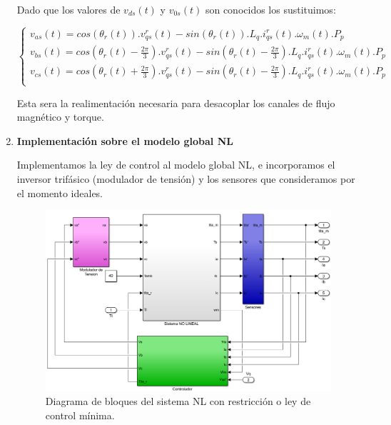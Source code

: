 \documentclass{article}
\begin{document}
\begin{enumerate}[label=\roman*.]
    Dado que los valores de $v_{ds}(t)$ y $v_{0s}(t)$ son conocidos los sustituimos: 

    \begin{equation}
        \begin{cases}
            v_{as}(t) = cos(\theta_{r}(t)).v_{qs}^r(t) - sin(\theta_{r}(t)).L_{q}.i_{qs}^r(t).\omega_{m}(t).P_{p}\\
            v_{bs}(t) = cos(\theta_{r}(t) - \frac{2\pi}{3}).v_{qs}^r(t) - sin(\theta_{r}(t) - \frac{2\pi}{3}).L_{q}.i_{qs}^r(t).\omega_{m}(t).P_{p}\\
            v_{cs}(t) = cos(\theta_{r}(t) + \frac{2\pi}{3}).v_{qs}^r(t) - sin(\theta_{r}(t) - \frac{2\pi}{3}).L_{q}.i_{qs}^r(t).\omega_{m}(t).P_{p}\\
        \end{cases}
    \end{equation}

    Esta sera la realimentación necesaria para desacoplar los canales de flujo magnético y torque.

    \item \textbf{Implementación sobre el modelo global NL}


    Implementamos la ley de control al modelo global NL, e incorporamos el inversor trifásico (modulador de tensión) y los sensores que consideramos por el momento ideales. 

    \begin{figure}[H]
        \centering
        \includegraphics[width=1\textwidth]{realimentacion.png}
        \caption{Diagrama de bloques del sistema NL con restricción o ley de control mínima.}
    \end{figure}


\end{enumerate}
\end{document}

